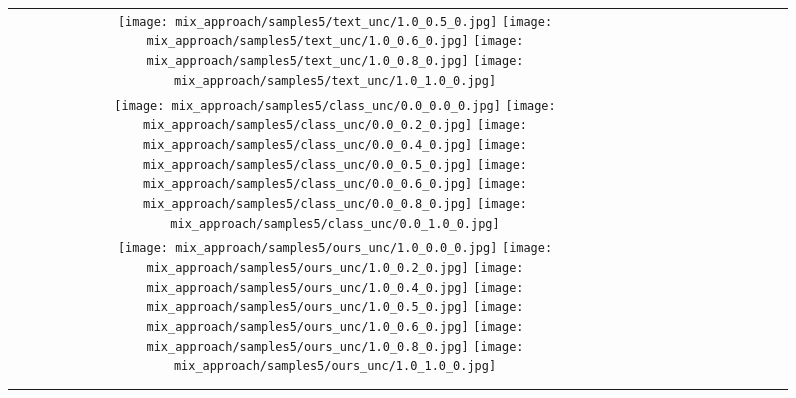 \documentclass[10pt,twocolumn,letterpaper]{article}
\begin{document}
\begin{figure}[tb!]
{\begin{tabular}{c c c c c c c c c c  }
\texttt{[image: mix\_approach/samples5/text\_unc/1.0\_0.5\_0.jpg]}
\texttt{[image: mix\_approach/samples5/text\_unc/1.0\_0.6\_0.jpg]}
\texttt{[image: mix\_approach/samples5/text\_unc/1.0\_0.8\_0.jpg]}
\texttt{[image: mix\_approach/samples5/text\_unc/1.0\_1.0\_0.jpg]}
\tabularnewline
    \raisebox{0.1in}{\rotatebox{90}{\small \emph{Class}
 }}
 \texttt{[image: mix\_approach/samples5/class\_unc/0.0\_0.0\_0.jpg]}
\texttt{[image: mix\_approach/samples5/class\_unc/0.0\_0.2\_0.jpg]}
\texttt{[image: mix\_approach/samples5/class\_unc/0.0\_0.4\_0.jpg]}
\texttt{[image: mix\_approach/samples5/class\_unc/0.0\_0.5\_0.jpg]}
\texttt{[image: mix\_approach/samples5/class\_unc/0.0\_0.6\_0.jpg]}
\texttt{[image: mix\_approach/samples5/class\_unc/0.0\_0.8\_0.jpg]}
\texttt{[image: mix\_approach/samples5/class\_unc/0.0\_1.0\_0.jpg]}
\tabularnewline
    \raisebox{0.1in}{\rotatebox{90}{\small \emph{Mix
} }}
  \texttt{[image: mix\_approach/samples5/ours\_unc/1.0\_0.0\_0.jpg]}
  \texttt{[image: mix\_approach/samples5/ours\_unc/1.0\_0.2\_0.jpg]}
  \texttt{[image: mix\_approach/samples5/ours\_unc/1.0\_0.4\_0.jpg]}
  \texttt{[image: mix\_approach/samples5/ours\_unc/1.0\_0.5\_0.jpg]}
  \texttt{[image: mix\_approach/samples5/ours\_unc/1.0\_0.6\_0.jpg]}
  \texttt{[image: mix\_approach/samples5/ours\_unc/1.0\_0.8\_0.jpg]}
  \texttt{[image: mix\_approach/samples5/ours\_unc/1.0\_1.0\_0.jpg]}

\tabularnewline



\tabularnewline
  
\vspace{2mm}
\vspace{-2\baselineskip}
\end{tabular}}
\vspace{-0.4cm}
\hspace{20pt}
\label{fig:glideablation2}
\vspace{-2mm}
\end{figure}  \begin{table}[t]
\centering


\end{table}
\end{document}
